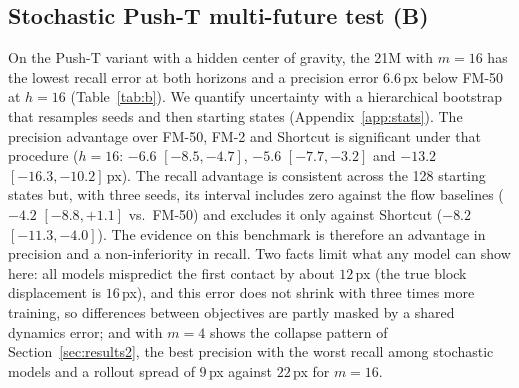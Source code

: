 \subsection{Stochastic Push-T multi-future test (B)}
\label{sec:b}
On the Push-T variant with a hidden center of gravity, the 21M \imlewm{} with $m{=}16$ has the lowest recall error at both horizons and a precision error $6.6$\,px below FM-50 at $h{=}16$ (Table~\ref{tab:b}). We quantify uncertainty with a hierarchical bootstrap that resamples seeds and then starting states (Appendix~\ref{app:stats}). The precision advantage over FM-50, FM-2 and Shortcut is significant under that procedure ($h{=}16$: $-6.6$ $[-8.5, -4.7]$, $-5.6$ $[-7.7, -3.2]$ and $-13.2$ $[-16.3, -10.2]$\,px). The recall advantage is consistent across the 128 starting states but, with three seeds, its interval includes zero against the flow baselines ($-4.2$ $[-8.8, +1.1]$ vs.\ FM-50) and excludes it only against Shortcut ($-8.2$ $[-11.3, -4.0]$). The evidence on this benchmark is therefore an advantage in precision and a non-inferiority in recall. Two facts limit what any model can show here: all models mispredict the first contact by about $12$\,px (the true block displacement is $16$\,px), and this error does not shrink with three times more training, so differences between objectives are partly masked by a shared dynamics error; and \imlewm{} with $m{=}4$ shows the collapse pattern of Section~\ref{sec:results2}, the best precision with the worst recall among stochastic models and a rollout spread of $9$\,px against $22$\,px for $m{=}16$.

